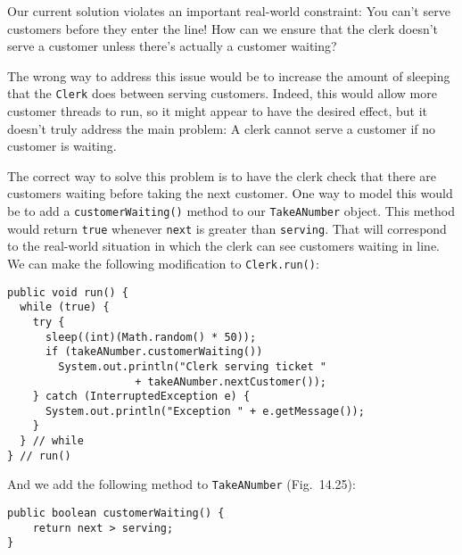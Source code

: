\noindent Our current solution violates an important
real-world constraint: You can't serve customers before they enter the
line! How can we ensure that the clerk doesn't serve a customer unless
there's actually a customer waiting?

The wrong way to address this issue would be to increase the amount of
sleeping that the {\tt Clerk} does between serving customers.  Indeed,
this would allow more customer threads to run, so it might appear to
have the desired effect, but it doesn't truly address the main
problem: A clerk cannot serve a customer if no customer is waiting.

The correct way to solve this problem is to have the clerk check that
there are customers waiting before taking the next customer.   One way
to model this would be to add a {\tt customerWaiting()} method to our
{\tt TakeANumber} object.   This method would return {\tt true}
whenever {\tt next} is greater than {\tt serving}. That will
correspond to the real-world situation in which the clerk can see
customers waiting in line.  We can make the following
modification to {\tt Clerk.run()}:

\begin{jjjlisting}
\begin{lstlisting}
public void run() {
  while (true) {
    try {
      sleep((int)(Math.random() * 50));
      if (takeANumber.customerWaiting())    
        System.out.println("Clerk serving ticket " 
                    + takeANumber.nextCustomer());
    } catch (InterruptedException e) {
      System.out.println("Exception " + e.getMessage());
    }
  } // while
} // run()
\end{lstlisting}
\end{jjjlisting}

\noindent And we add the following method to {\tt TakeANumber} 
(Fig.~14.25):

\begin{jjjlisting}
\begin{lstlisting}
public boolean customerWaiting() {
    return next > serving;
}
\end{lstlisting}
\end{jjjlisting}

